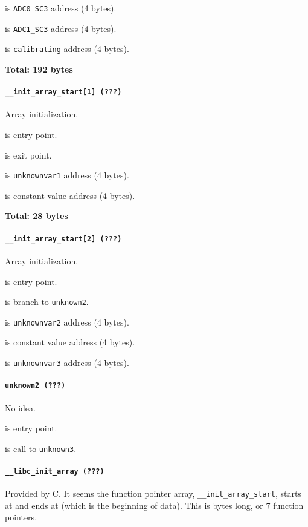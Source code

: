  is \texttt{ADC0\_SC3} address (4 bytes).

 is \texttt{ADC1\_SC3} address (4 bytes).

 is \texttt{calibrating} address (4 bytes).

\textbf{Total: 192 bytes}

\paragraph{\texttt{\_\_init\_array\_start[1] (???)}} Array initialization.

 is entry point.

 is exit point.

 is \texttt{unknownvar1} address (4 bytes).

 is constant value address (4 bytes).

\textbf{Total: 28 bytes}

\paragraph{\texttt{\_\_init\_array\_start[2] (???)}} Array initialization.

 is entry point.

 is branch to \texttt{unknown2}.

 is \texttt{unknownvar2} address (4 bytes).

 is constant value address (4 bytes).

 is \texttt{unknownvar3} address (4 bytes).

\paragraph{\texttt{unknown2 (???)}} No idea.

 is entry point.

 is call to \texttt{unknown3}.

\paragraph{\texttt{\_\_libc\_init\_array (???)}} Provided by C. It seems the
function pointer array,  \texttt{\_\_init\_array\_start}, starts at
 and ends at  (which is the beginning of
data). This is  bytes long, or 7 function pointers.

